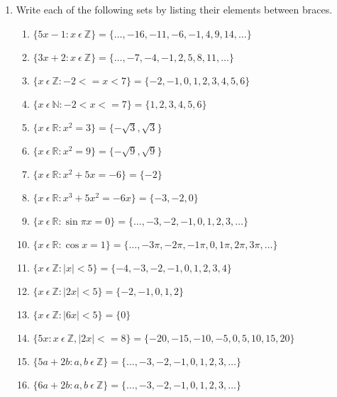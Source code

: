 \documentclass[../main.tex]{subfiles}
\begin{document}
\renewcommand{\labelenumi}{\textbf{\Alph{enumi}.}}
\begin{enumerate}

  \item Write each of the following sets by listing their elements between braces.

    \renewcommand{\labelenumii}{\textbf{\arabic{enumii}.}}
    \begin{enumerate}

      \item $\{5x-1: x~\epsilon~\mathbb{Z}\} = \{\ldots, -16, -11, -6, -1, 4, 9, 14,\ldots\}$
      \item $\{3x+2: x~\epsilon~\mathbb{Z}\} = \{\ldots, -7, -4, -1, 2, 5, 8, 11,\ldots\}$
      \item $\{x~\epsilon~\mathbb{Z}: -2 <= x <7\} = \{-2, -1, 0, 1, 2, 3, 4, 5, 6\}$
      \item $\{x~\epsilon~\mathbb{N}: -2 < x <= 7\} = \{1, 2, 3, 4, 5, 6\}$
      \item $\{x~\epsilon~\mathbb{R}: x^2 = 3\} = \{-\sqrt3, \sqrt3\}$

      \item $\{x~\epsilon~\mathbb{R}: x^2 = 9\} = \{-\sqrt9, \sqrt9\}$
      \item $\{x~\epsilon~\mathbb{R}: x^2 + 5x = -6\} = \{-2\}$
      \item $\{x~\epsilon~\mathbb{R}: x^3 + 5x^2 = -6x\} = \{-3, -2, 0\}$
      \item $\{x~\epsilon~\mathbb{R}: \sin \pi x = 0\} = \{\ldots, -3, -2, -1, 0, 1, 2, 3, \ldots\}$
      \item $\{x~\epsilon~\mathbb{R}: \cos x = 1\} = \{\ldots, -3\pi , -2\pi , -1\pi , 0, 1\pi , 2\pi , 3\pi , \ldots\}$

      \item $\{x~\epsilon~\mathbb{Z}: |x| < 5\} = \{-4, -3, -2, -1, 0, 1, 2, 3, 4\}$
      \item $\{x~\epsilon~\mathbb{Z}: |2x| < 5\} = \{-2, -1, 0, 1, 2\}$
      \item $\{x~\epsilon~\mathbb{Z}: |6x| < 5\} = \{0\}$
      \item $\{5x: x~\epsilon~\mathbb{Z}, |2x| <= 8\} = \{-20, -15, -10, -5, 0, 5, 10, 15, 20\}$
      \item $\{5a + 2b: a, b~\epsilon~\mathbb{Z}\} = \{\ldots, -3, -2, -1, 0, 1, 2, 3, \ldots\}$

      \item $\{6a + 2b: a, b~\epsilon~\mathbb{Z}\} = \{\ldots, -3, -2, -1, 0, 1, 2, 3, \ldots\}$


\end{enumerate}
\end{enumerate}
\end{document}
